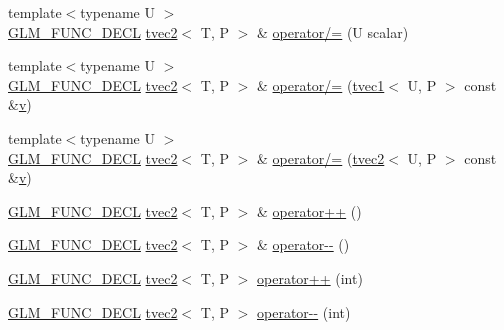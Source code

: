 \begin{DoxyCompactItemize}
\item 
{\footnotesize template$<$typename U $>$ }\\\mbox{\hyperlink{setup_8hpp_ab2d052de21a70539923e9bcbf6e83a51}{G\+L\+M\+\_\+\+F\+U\+N\+C\+\_\+\+D\+E\+CL}} \mbox{\hyperlink{structglm_1_1tvec2}{tvec2}}$<$ T, P $>$ \& \mbox{\hyperlink{structglm_1_1tvec2_ae917fca6ea5283f763f1887f778a6ded}{operator/=}} (U scalar)
\item 
{\footnotesize template$<$typename U $>$ }\\\mbox{\hyperlink{setup_8hpp_ab2d052de21a70539923e9bcbf6e83a51}{G\+L\+M\+\_\+\+F\+U\+N\+C\+\_\+\+D\+E\+CL}} \mbox{\hyperlink{structglm_1_1tvec2}{tvec2}}$<$ T, P $>$ \& \mbox{\hyperlink{structglm_1_1tvec2_a4e8369479212934e679d59357f82db7b}{operator/=}} (\mbox{\hyperlink{structglm_1_1tvec1}{tvec1}}$<$ U, P $>$ const \&\mbox{\hyperlink{glad_8h_a14cfbe2fc2234f5504618905b69d1e06}{v}})
\item 
{\footnotesize template$<$typename U $>$ }\\\mbox{\hyperlink{setup_8hpp_ab2d052de21a70539923e9bcbf6e83a51}{G\+L\+M\+\_\+\+F\+U\+N\+C\+\_\+\+D\+E\+CL}} \mbox{\hyperlink{structglm_1_1tvec2}{tvec2}}$<$ T, P $>$ \& \mbox{\hyperlink{structglm_1_1tvec2_a42e14ad86fc32cc36ba3a512cd638585}{operator/=}} (\mbox{\hyperlink{structglm_1_1tvec2}{tvec2}}$<$ U, P $>$ const \&\mbox{\hyperlink{glad_8h_a14cfbe2fc2234f5504618905b69d1e06}{v}})
\item 
\mbox{\hyperlink{setup_8hpp_ab2d052de21a70539923e9bcbf6e83a51}{G\+L\+M\+\_\+\+F\+U\+N\+C\+\_\+\+D\+E\+CL}} \mbox{\hyperlink{structglm_1_1tvec2}{tvec2}}$<$ T, P $>$ \& \mbox{\hyperlink{structglm_1_1tvec2_aee5dc4593579348b1f53ce6296337702}{operator++}} ()
\item 
\mbox{\hyperlink{setup_8hpp_ab2d052de21a70539923e9bcbf6e83a51}{G\+L\+M\+\_\+\+F\+U\+N\+C\+\_\+\+D\+E\+CL}} \mbox{\hyperlink{structglm_1_1tvec2}{tvec2}}$<$ T, P $>$ \& \mbox{\hyperlink{structglm_1_1tvec2_af751da3c19f0f22f8eb2bac9003f9384}{operator-\/-\/}} ()
\item 
\mbox{\hyperlink{setup_8hpp_ab2d052de21a70539923e9bcbf6e83a51}{G\+L\+M\+\_\+\+F\+U\+N\+C\+\_\+\+D\+E\+CL}} \mbox{\hyperlink{structglm_1_1tvec2}{tvec2}}$<$ T, P $>$ \mbox{\hyperlink{structglm_1_1tvec2_ab479786d89c64c96e9611c7c93fb29c5}{operator++}} (int)
\item 
\mbox{\hyperlink{setup_8hpp_ab2d052de21a70539923e9bcbf6e83a51}{G\+L\+M\+\_\+\+F\+U\+N\+C\+\_\+\+D\+E\+CL}} \mbox{\hyperlink{structglm_1_1tvec2}{tvec2}}$<$ T, P $>$ \mbox{\hyperlink{structglm_1_1tvec2_a4206b03754b7b3ba80a3a9365755f882}{operator-\/-\/}} (int)

\end{DoxyCompactItemize}
